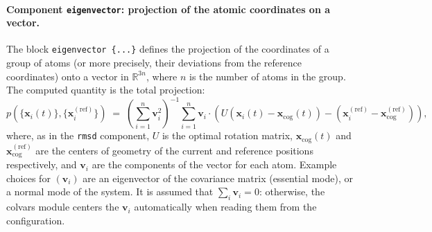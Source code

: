 \paragraph*{Component \texttt{eigenvector}: projection of the atomic
  coordinates on a vector.}  The block
\texttt{eigenvector~\{...\}} defines the projection of the coordinates
of a group of atoms (or more precisely, their deviations from the
reference coordinates) onto a vector in $\mathbb{R}^{3n}$, where $n$ is the
number of atoms in the group. The computed quantity is the
total projection:
\begin{equation}
  \label{eq:cvc_eigenvector}
  { p(\{\mathbf{x}_{i}(t)\},
    \{\mathbf{x}_{i}^{\mathrm{(ref)}}\}) } \; = \; {
    \left(\sum_{i=1}^{n}\mathbf{v}_{i}^{2}\right)^{-1} \sum_{i=1}^{n} 
    \mathbf{v}_{i} \cdot
    \left(U(\mathbf{x}_{i}(t) - \mathbf{x}_{\mathrm{cog}}(t)) -
      (\mathbf{x}_{i}^{\mathrm{(ref)}} -
      \mathbf{x}_{\mathrm{cog}}^{\mathrm{(ref)}}) \right)\mathrm{,} }
\end{equation}
where, as in the \texttt{rmsd} component, $U$ is the optimal rotation
matrix, $\mathbf{x}_{\mathrm{cog}}(t)$ and
$\mathbf{x}_{\mathrm{cog}}^{\mathrm{(ref)}}$ are the centers of
geometry of the current and reference positions respectively, and
$\mathbf{v}_{i}$ are the components of the vector for each atom.
Example choices for $(\mathbf{v}_{i})$ are an eigenvector
of the covariance matrix (essential mode), or a normal
mode of the system.  It is assumed that $\sum_{i}\mathbf{v}_{i} = 0$:
otherwise, the colvars module centers the $\mathbf{v}_{i}$
automatically when reading them from the configuration.


